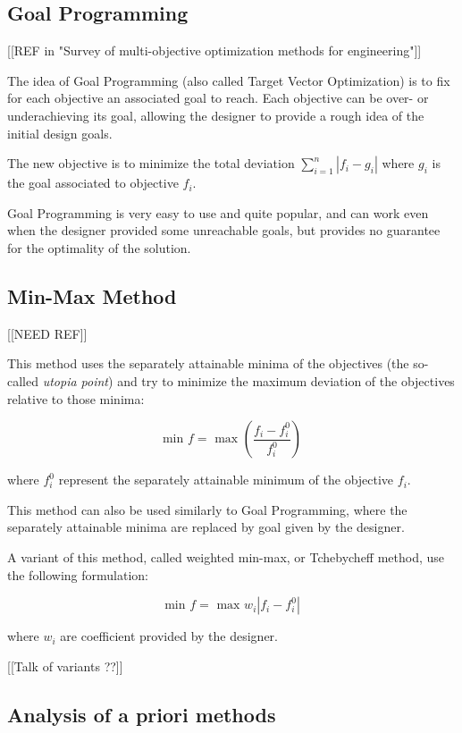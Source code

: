\subsection{Goal Programming}

[[REF in "Survey of multi-objective optimization methods for engineering"]]

The idea of Goal Programming (also called Target Vector Optimization) is to fix for each objective an associated goal to reach. Each objective can be over- or underachieving its goal, allowing the designer to provide a rough idea of the initial design goals.

The new objective is to minimize the total deviation $\sum_{i=1}^n |f_i - g_i|$ where $g_i$ is the goal associated to objective $f_i$.

Goal Programming is very easy to use and quite popular, and can work even when the designer provided some unreachable goals, but provides no guarantee for the optimality of the solution.

\subsection{Min-Max Method}

[[NEED REF]]

This method uses the separately attainable minima of the objectives (the so-called \emph{utopia point}) and try to minimize the maximum deviation of the objectives relative to those minima:

\[ \text{min } f = \text{ max } \left( \frac{f_i - f_i^0}{f_i^0} \right) \]

where $f_i^0$ represent the separately attainable minimum of the objective $f_i$.

This method can also be used similarly to Goal Programming, where the separately attainable minima are replaced by goal given by the designer.

A variant of this method, called weighted min-max, or Tchebycheff method, use the following formulation:

\[ \text{min } f = \text{ max } w_i |f_i - f_i^0| \]

where $w_i$ are coefficient provided by the designer.

[[Talk of variants ??]]

\subsection{Analysis of a priori methods}

